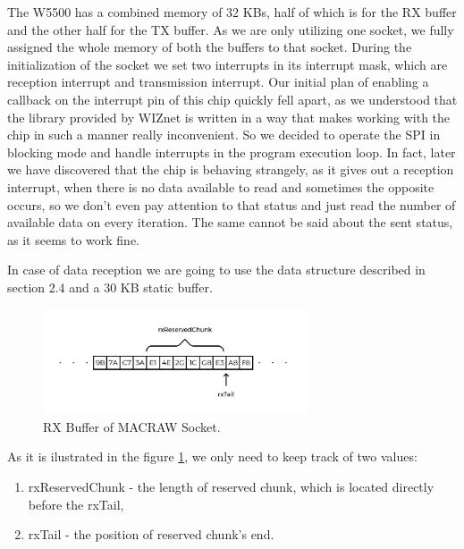 The W5500 has a combined memory of 32 KBs, half of which is for the RX buffer and the other half for the TX buffer. As we are only utilizing one socket, we fully assigned the whole memory of both the buffers to that socket. During the initialization of the socket we set two interrupts in its interrupt mask, which are reception interrupt and transmission interrupt. Our initial plan of enabling a callback on the interrupt pin of this chip quickly fell apart, as we understood that the library provided by WIZnet is written in a way that makes working with the chip in such a manner really inconvenient. So we decided to operate the SPI in blocking mode and handle interrupts in the program execution loop. In fact, later we have discovered that the chip is behaving strangely, as it gives out a reception interrupt, when there is no data available to read and sometimes the opposite occurs, so we don't even pay attention to that status and just read the number of available data on every iteration. The same cannot be said about the sent status, as it seems to work fine.

In case of data reception we are going to use the data structure described in section 2.4 and a 30 KB static buffer. 

\begin{figure}[htp]
\begin{center}
\includegraphics[width=0.7\textwidth]{macraw-rx-buffer}
\end{center}
\caption{RX Buffer of MACRAW Socket.}
\label{macraw-rx-buffer}
\end{figure}

As it is ilustrated in the figure \ref{macraw-rx-buffer}, we only need to keep track of two values: 
\begin{enumerate}[nolistsep]
    \item rxReservedChunk - the length of reserved chunk, which is located directly before the rxTail,
    \item rxTail - the position of reserved chunk's end.
\end{enumerate}

